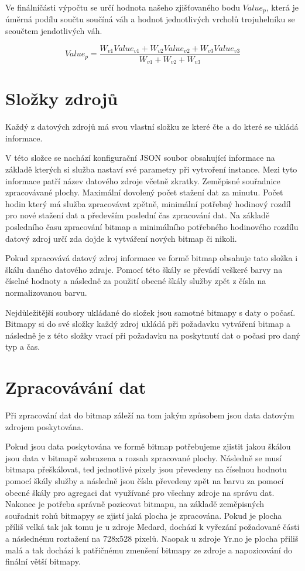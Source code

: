\documentclass[czech,bachelor,dept460,male,csharp,cpdeclaration]{diploma}
\begin{document}
	Ve finálníčásti výpočtu se určí hodnota našeho zjišťovaného bodu $Value_p$, která je úměrná podílu součtu součíná váh a hodnot jednotlivých vrcholů trojuhelníku se seoučtem jendotlivých váh.
	
	\[Value_p = \frac{W_{v1}Value_{v1} + W_{v2}Value_{v2} + W_{v3}Value_{v3}}{W_{v1} + W_{v2} + W_{v3}} \]
	
	\section{Složky zdrojů}
	
	Každý z datových zdrojů má svou vlastní složku ze které čte a do které se ukládá informace.
	
	V této složce se nachází konfigurační JSON soubor obsahující informace na základě kterých si služba nastaví své parametry při vytvoření instance. Mezi tyto informace patří název datového zdroje včetně zkratky. Zeměpisné souřadnice zpracovávané plochy. Maximální dovolený počet stažení dat za minutu. Počet hodin který má služba zpracovávat zpětně, minimální potřebný hodinový rozdíl pro nové stažení dat a především poslední čas zpracování dat. Na základě posledního času zpracování bitmap a minimálního potřebného hodinového rozdílu datový zdroj určí zda dojde k vytváření nových bitmap či nikoli.
	
	Pokud zpracovává datový zdroj informace ve formě bitmap obsahuje tato složka i škálu daného datového zdraje. Pomocí této škály se převádí veškeré barvy na číselné hodnoty a následně za použití obecné škály služby zpět z čísla na normalizovanou barvu.
	
	Nejdůležitější soubory ukládané do složek jsou samotné bitmapy s daty o počasí. Bitmapy si do své složky každý zdroj ukládá při požadavku vytváření bitmap a následně je z této složky vrací při požadavku na poskytnutí dat o počasí pro daný typ a čas.
	
	\section{Zpracovávání dat}
	
	Při zpracování dat do bitmap záleží na tom jakým způsobem jsou data datovým zdrojem poskytována.
	
	Pokud jsou data poskytována ve formě bitmap potřebujeme zjistit jakou škálou jsou data v bitmapě zobrazena a rozsah zpracované plochy. Následně se musí bitmapa přeškálovat, ted jednotlivé pixely jsou převedeny na číselnou hodnotu pomocí škály služby a následně jsou čísla převedeny zpět na barvu za pomocí obecné škály pro agregaci dat využívané pro všechny zdroje na správu dat. Nakonec je potřeba správně pozicovat bitmapu, na základě zeměpisných souřadnit rohů bitmapyy se zjistí jaká plocha je zpracována. Pokud je plocha příliš velká tak jak tomu je u zdroje Medard, dochází k vyřezání požadované části a následnému roztažení na 728x528 pixelů. Naopak u zdroje Yr.no je plocha přiliš malá a tak dochází k patřičnému zmenšení bitmapy ze zdroje a napozicování do finální větší bitmapy.
	
\end{document}
